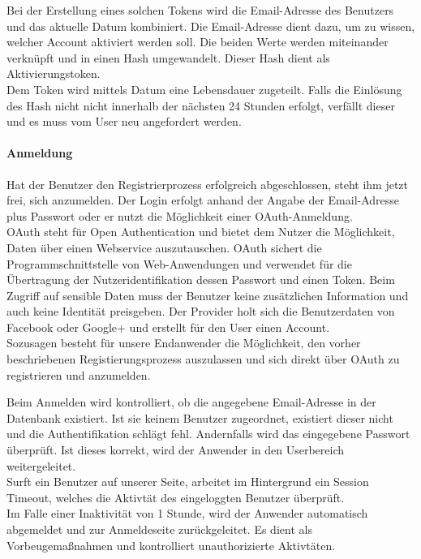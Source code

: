 Bei der Erstellung eines solchen Tokens wird die Email-Adresse des Benutzers und das aktuelle Datum kombiniert. Die Email-Adresse dient dazu, um zu wissen, welcher Account aktiviert werden soll. Die beiden Werte werden miteinander verknüpft und in einen Hash umgewandelt. Dieser Hash dient als Aktivierungstoken.\\

Dem Token wird mittels Datum eine Lebensdauer zugeteilt. Falls die Einlösung des Hash nicht nicht innerhalb der nächsten 24 Stunden erfolgt, verfällt dieser und es muss vom User neu angefordert werden. 

\paragraph{Anmeldung}
Hat der Benutzer den Registrierprozess erfolgreich abgeschlossen, steht ihm jetzt frei, sich anzumelden. Der Login erfolgt anhand der Angabe der Email-Adresse plus Passwort oder er nutzt die Möglichkeit einer OAuth-Anmeldung.\\

OAuth steht für Open Authentication und bietet dem Nutzer die Möglichkeit, Daten über einen Webservice auszutauschen. \grqq{}OAuth sichert die Programmschnittstelle von Web-Anwendungen und verwendet für die Übertragung der Nutzeridentifikation dessen Passwort und einen Token\grqq{}\cite{OAUTH}. Beim Zugriff auf sensible Daten muss der Benutzer keine zusätzlichen Information und auch keine Identität preisgeben. Der Provider holt sich die Benutzerdaten von Facebook oder Google+ und erstellt für den User einen Account.\\
Sozusagen besteht für unsere Endanwender die Möglichkeit, den vorher beschriebenen Registierungsprozess auszulassen und sich direkt über OAuth zu registrieren und anzumelden.


Beim Anmelden wird kontrolliert, ob die angegebene Email-Adresse in der Datenbank existiert. Ist sie keinem Benutzer zugeordnet, existiert dieser nicht und die Authentifikation schlägt fehl. Andernfalls wird das eingegebene Passwort überprüft. Ist dieses korrekt, wird der Anwender in den Userbereich weitergeleitet.\\

Surft ein Benutzer auf unserer Seite, arbeitet im Hintergrund ein Session Timeout, welches die Aktivtät des eingeloggten Benutzer überprüft.\\
Im Falle einer Inaktivität von 1 Stunde, wird der Anwender automatisch abgemeldet und zur Anmeldeseite zurückgeleitet. Es dient als Vorbeugemaßnahmen und kontrolliert unauthorizierte Aktivtäten.

